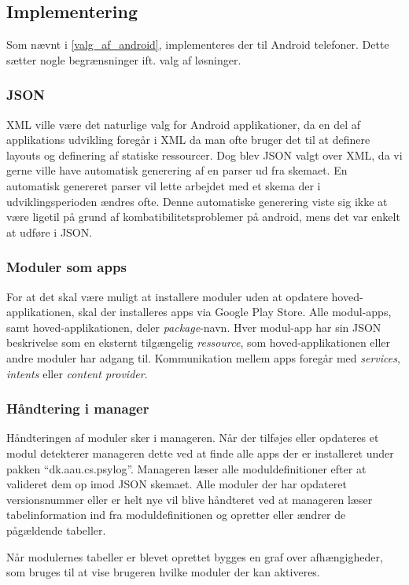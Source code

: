 \subsection{Implementering}
Som nævnt i \cref{valg_af_android}, implementeres der til Android telefoner.
Dette sætter nogle begrænsninger ift. valg af løsninger.

\subsubsection{JSON}
XML ville være det naturlige valg for Android applikationer, da en del af applikations udvikling foregår i XML da man ofte bruger det til at definere layouts og definering af statiske ressourcer. 
Dog blev JSON valgt over XML, da vi gerne ville have automatisk generering af en parser ud fra skemaet.
En automatisk genereret parser vil lette arbejdet med et skema der i udviklingsperioden ændres ofte.
Denne automatiske generering viste sig ikke at være ligetil på grund af kombatibilitetsproblemer på android, mens det var enkelt at udføre i JSON.

\subsubsection{Moduler som apps}
For at det skal være muligt at installere moduler uden at opdatere hoved-applikationen, skal der installeres apps via Google Play Store.
Alle modul-apps, samt hoved-applikationen, deler \textit{package}-navn.
Hver modul-app har sin JSON beskrivelse som en eksternt tilgængelig \textit{ressource}, som hoved-applikationen eller andre moduler har adgang til.
Kommunikation mellem apps foregår med \textit{services}, \textit{intents} eller \textit{content provider}.


\subsubsection{Håndtering i manager}
Håndteringen af moduler sker i manageren.
Når der tilføjes eller opdateres et modul detekterer manageren dette ved at finde alle apps der er installeret under pakken ``dk.aau.cs.psylog''.
Manageren læser alle moduldefinitioner efter at valideret dem op imod JSON skemaet.
Alle moduler der har opdateret versionsnummer eller er helt nye vil blive håndteret ved at manageren læser tabelinformation ind fra moduldefinitionen og opretter eller ændrer de pågældende tabeller.

Når modulernes tabeller er blevet oprettet bygges en graf over afhængigheder, som bruges til at vise brugeren hvilke moduler der kan aktiveres.
